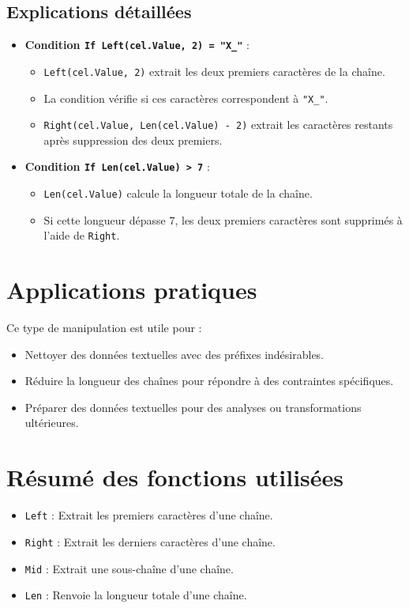 \documentclass[a4paper,12pt]{report}
\begin{document}
\subsection*{Explications détaillées}

\begin{itemize}
	\item \textbf{Condition \texttt{If Left(cel.Value, 2) = "X\_"}} :
	\begin{itemize}
		\item \texttt{Left(cel.Value, 2)} extrait les deux premiers caractères de la chaîne.
		\item La condition vérifie si ces caractères correspondent à \texttt{"X\_"}.
		\item \texttt{Right(cel.Value, Len(cel.Value) - 2)} extrait les caractères restants après suppression des deux premiers.
	\end{itemize}
	\item \textbf{Condition \texttt{If Len(cel.Value) > 7}} :
	\begin{itemize}
		\item \texttt{Len(cel.Value)} calcule la longueur totale de la chaîne.
		\item Si cette longueur dépasse 7, les deux premiers caractères sont supprimés à l'aide de \texttt{Right}.
	\end{itemize}
\end{itemize}

\section{Applications pratiques}

Ce type de manipulation est utile pour :
\begin{itemize}
	\item Nettoyer des données textuelles avec des préfixes indésirables.
	\item Réduire la longueur des chaînes pour répondre à des contraintes spécifiques.
	\item Préparer des données textuelles pour des analyses ou transformations ultérieures.
\end{itemize}

\section{Résumé des fonctions utilisées}

\begin{itemize}
	\item \texttt{Left} : Extrait les premiers caractères d'une chaîne.
	\item \texttt{Right} : Extrait les derniers caractères d'une chaîne.
	\item \texttt{Mid} : Extrait une sous-chaîne d'une chaîne.
	\item \texttt{Len} : Renvoie la longueur totale d'une chaîne.
\end{itemize}
\end{document}
